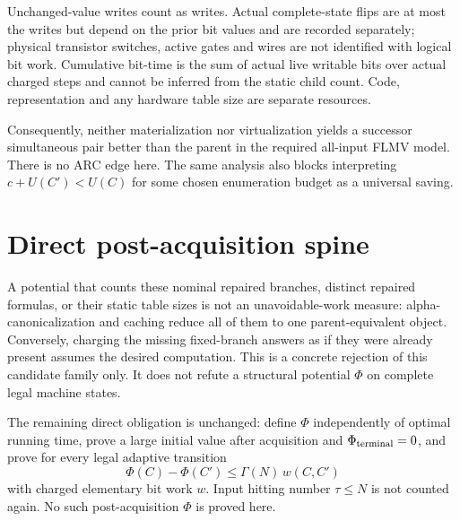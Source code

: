\documentclass[11pt]{article}
\begin{document}
Unchanged-value writes count as writes.  Actual complete-state flips are at
most the writes but depend on the prior bit values and are recorded separately;
physical transistor switches, active gates and wires are not identified with
logical bit work.  Cumulative bit-time is the sum of actual live writable bits
over actual charged steps and cannot be inferred from the static child count.
Code, representation and any hardware table size are separate resources.

Consequently, neither materialization nor virtualization yields a successor
simultaneous pair better than the parent in the required all-input FLMV model.
There is no ARC edge here.  The same analysis also blocks interpreting
$c+U(C')<U(C)$ for some chosen enumeration budget as a universal saving.

\section{Direct post-acquisition spine}
A potential that counts these nominal repaired branches, distinct repaired
formulas, or their static table sizes is not an unavoidable-work measure:
alpha-canonicalization and caching reduce all of them to one parent-equivalent
object.  Conversely, charging the missing fixed-branch answers as if they were
already present assumes the desired computation.  This is a concrete rejection
of this candidate family only.  It does not refute a structural potential
$\Phi$ on complete legal machine states.

The remaining direct obligation is unchanged: define $\Phi$ independently of
optimal running time, prove a large initial value after acquisition and
$\Phi_{\rm terminal}=0$, and prove for every legal adaptive transition
\[
 \Phi(C)-\Phi(C')\leq \Gamma(N)\,w(C,C')
\]
with charged elementary bit work $w$.  Input hitting number $\tau\leq N$ is
not counted again.  No such post-acquisition $\Phi$ is proved here.
\end{document}
